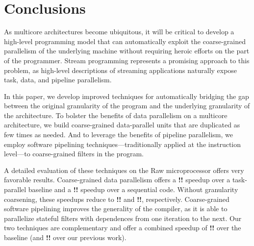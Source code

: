 \section{Conclusions}

As multicore architectures become ubiquitous, it will be critical to
develop a high-level programming model that can automatically exploit
the coarse-grained parallelism of the underlying machine without
requiring heroic efforts on the part of the programmer.  Stream
programming represents a promising approach to this problem, as
high-level descriptions of streaming applications naturally expose
task, data, and pipeline parallelism.  

In this paper, we develop improved techniques for automatically
bridging the gap between the original granularity of the program and
the underlying granularity of the architecture.  To bolster the
benefits of data parallelism on a multicore architecture, we build
coarse-grained data-parallel units that are duplicated as few times as
needed.  And to leverage the benefits of pipeline parallelism, we
employ software pipelining techniques---traditionally applied at the
instruction level---to coarse-grained filters in the program.

A detailed evaluation of these techniques on the Raw microprocessor
offers very favorable results.  Coarse-grained data parallelism offers
a {\bf !!} speedup over a task-parallel baseline and a {\bf !!}
speedup over a sequential code.  Without granularity coarsening, these
speedups reduce to {\bf !!} and {\bf !!}, respectively.
Coarse-grained software pipelining improves the generality of the
compiler, as it is able to parallelize stateful filters with
dependences from one iteration to the next.  Our two techniques are
complementary and offer a combined speedup of {\bf !!} over the
baseline (and {\bf !!} over our previous work).


